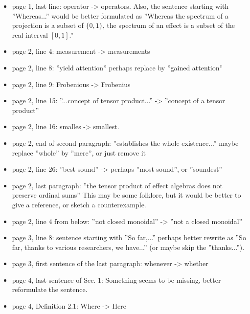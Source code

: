 \documentclass[12pt]{article}
\begin{document}
\begin{itemize}
\item page 1, last line: operator -> operators. Also, the sentence starting with ''Whereas...'' would be better formulated as ''Whereas the spectrum of a projection is a subset of $\{0,1\}$, the spectrum of an effect
is a subset of the real interval $[0,1]$.''

\item page 2, line 4: measurement -> measurements

\item  page 2, line 8: ''yield attention'' perhaps replace by ''gained attention''

\item page 2, line 9: Frobenious -> Frobenius

\item page 2, line 15: ''...concept of tensor product...'' -> ''concept of a tensor product''

\item page 2, line 16: smalles -> smallest. 

\item page 2, end of second paragraph: ''establishes the whole existence...'' maybe replace
''whole'' by ''mere'', or just remove it

\item page 2, line 26: ''best sound'' -> perhaps ''most sound'', or ''soundest''

\item page 2, last paragraph: ''the tensor product of effect algebras does not preserve
ordinal sums'' This may be some folklore, but it would be better to give a reference,
or sketch a counterexample.

\item page 2, line 4 from below: ''not closed monoidal'' -> ''not a closed monoidal''

\item page 3, line 8: sentence starting with ''So far,...'' perhaps better rewrite as
''So far, thanks to various researchers, we have...'' (or maybe skip the ''thanks...'').

\item  page 3, first sentence of the last paragraph: whenever -> whether

\item page 4, last sentence of Sec. 1: Something seems to be missing, better reformulate the
sentence.

\item page 4, Definition 2.1: Where -> Here


\end{itemize}
\end{document}
